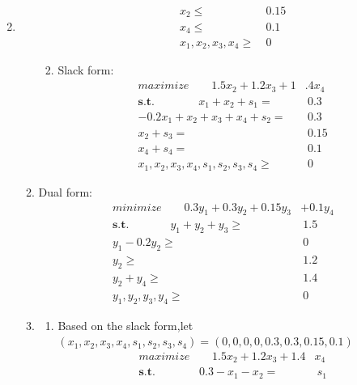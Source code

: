 \documentclass[12pt,a4paper]{article}
\makeatletter
\newtheorem*{solution}{Solution}
\theoremstyle{definition}
\renewenvironment{solution}[1][Solution] {\par\pushQED{\qed}\normalfont\topsep6\p@\@plus6\p@\relax\trivlist\item[\hskip\labelsep\bfseries#1\@addpunct{.}]\ignorespaces}{\popQED\endtrivlist\@endpefalse} \makeatother
\makeatother
\begin{document}
\begin{enumerate}
\begin{solution}
\begin{enumerate}
\begin{enumerate}
\begin{equation}
\begin{aligned}
               x_2\le&~0.15\\
               x_4\le&~0.1\\
               x_1,x_2,x_3,x_4\ge&~0
                \end{aligned}
            \end{equation}
            \item Slack form:
            \begin{equation}
                \begin{aligned}
                maximize ~~~~~~~~~1.5x_2+1.2x_3+1&.4x_4\\
                \textbf{s.t. }~~~~~~~~~~~~~~~~x_1+x_2+s_1=&~0.3\\
               -0.2x_1+x_2+x_3+x_4+s_2=&~0.3\\
               x_2+s_3=&~0.15\\
               x_4+s_4=&~0.1\\
               x_1,x_2,x_3,x_4,s_1,s_2,s_3,s_4\ge&~0
                \end{aligned}
            \end{equation}
        \end{enumerate}
        \item Dual form:
         \begin{equation}
                \begin{aligned}
                minimize ~~~~~~~~~0.3y_1+0.3y_2+0.15y_3&+0.1y_4\\
                  \textbf{s.t. }~~~~~~~~~~~~~~~y_1+y_2+y_3\ge&~1.5\\
                y_1-0.2y_2\ge&~0\\
                y_2\ge&~1.2\\
                y_2+y_4\ge&~1.4\\
                y_1,y_2,y_3,y_4\ge&~0
                \end{aligned}
            \end{equation}
            \item 
            \begin{enumerate}
                \item Based on the slack form,let $(x_1,x_2,x_3,x_4,s_1,s_2,s_3,s_4)=(0,0,0,0,0.3,0.3,0.15,0.1)$
                \begin{equation}
                \begin{aligned}
                maximize ~~~~~~~~~1.5x_2+1.2x_3+1.4&x_4\\
                \textbf{s.t. }~~~~~~~~~~~~~~~~0.3-x_1-x_2=&~s_1\\

\end{aligned}
\end{equation}
\end{enumerate}
\end{enumerate}
\end{solution}
\end{enumerate}
\end{document}
